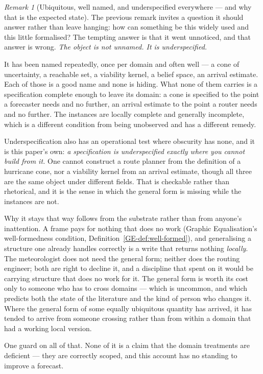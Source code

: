 \documentclass[11pt,a4paper]{article}
\theoremstyle{remark}
\newtheorem{remark}[definition]{Remark}
\begin{document}
\begin{remark}[Ubiquitous, well named, and underspecified everywhere --- and why that is the expected state]\label{rem:underspecified}
The previous remark invites a question it should answer rather than leave hanging: how can something
be this widely used and this little formalised? The tempting answer is that it went unnoticed, and that
answer is wrong. \emph{The object is not unnamed. It is underspecified.}

It has been named repeatedly, once per domain and often well --- a cone of uncertainty, a reachable
set, a viability kernel, a belief space, an arrival estimate. Each of those is a good name and none is
hiding. What none of them carries is a specification complete enough to leave its domain: a cone is
specified to the point a forecaster needs and no further, an arrival estimate to the point a router
needs and no further. The instances are locally complete and generally incomplete, which is a
different condition from being unobserved and has a different remedy.

Underspecification also has an operational test where obscurity has none, and it is this paper's own:
\emph{a specification is underspecified exactly where you cannot build from it.} One cannot construct
a route planner from the definition of a hurricane cone, nor a viability kernel from an arrival
estimate, though all three are the same object under different fields. That is checkable rather than
rhetorical, and it is the sense in which the general form is missing while the instances are not.

Why it stays that way follows from the substrate rather than from anyone's inattention. A frame pays
for nothing that does no work (Graphic Equalisation's well-formedness condition,
Definition~\ref{GE-def:well-formed}), and generalising a
structure one already handles correctly is a write that returns nothing \emph{locally}. The
meteorologist does not need the general form; neither does the routing engineer; both are right to
decline it, and a discipline that spent on it would be carrying structure that does no work for it.
The general form is worth its cost only to someone who has to cross domains --- which is uncommon, and
which predicts both the state of the literature and the kind of person who changes it. Where the
general form of some equally ubiquitous quantity has arrived, it has tended to arrive from someone
crossing rather than from within a domain that had a working local version.

One guard on all of that. None of it is a claim that the
domain treatments are deficient --- they are correctly scoped, and this account has no standing to
improve a forecast.


\end{remark}
\end{document}

